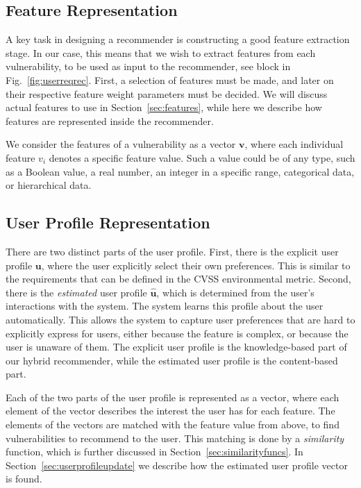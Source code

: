 {\subsection{Feature Representation} \label{sec:featurerepresentation}
A key task in designing a recommender is constructing a good feature extraction stage. In our case, this means that we wish to extract features from each vulnerability, to be used as input to the recommender, see block  in Fig.~\ref{fig:userreqrec}.
First, a selection of features must be made, and later on their respective feature weight parameters must be decided. We will discuss actual features to use in Section~\ref{sec:features}, while here we describe how features are represented inside the recommender.

We consider the features of a vulnerability as a vector $\bm{v}$, where each individual feature $v_i$ denotes a specific feature value. Such a value could be of any type, such as a Boolean value, a real number, an integer in a specific range, categorical data, or hierarchical data. %

\subsection{User Profile Representation}
There are two distinct parts of the user profile. First, there is the explicit user profile $\bm{u}$, where the user explicitly select their own preferences. This is similar to the requirements that can be defined in the CVSS environmental metric.
Second, there is the \emph{estimated} user profile $\bm{\hat{u}}$, which is determined from the user's interactions with the system.
The system learns this profile about the user automatically.
This allows the system to capture user preferences that are hard to explicitly express for users, either because the feature is complex, or because the user is unaware of them.
The explicit user profile is the knowledge-based part of our hybrid recommender, while the estimated user profile is the content-based part.

Each of the two parts of the user profile is represented as a vector, where each element of the vector describes the interest the user has for each feature. The elements of the vectors are matched with the feature value from above, to find vulnerabilities to recommend to the user.
This matching is done by a \emph{similarity} function, which is further discussed in Section~\ref{sec:similarityfuncs}.
In Section~\ref{sec:userprofileupdate} we describe how the estimated user profile vector is found.

}
